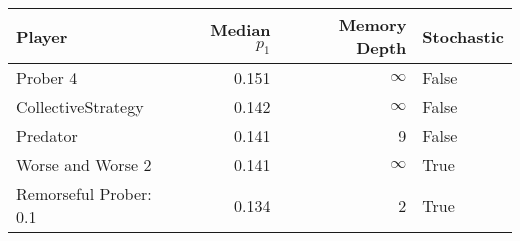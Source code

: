 \begin{tabular}{lrrl}
\toprule
                 Player &  Median $p_1$ &  Memory Depth & Stochastic \\
\midrule
               Prober 4 &         0.151 &            \(\infty\) &      False \\
     CollectiveStrategy &         0.142 &            \(\infty\) &      False \\
               Predator &         0.141 &             9 &      False \\
      Worse and Worse 2 &         0.141 &            \(\infty\) &       True \\
 Remorseful Prober: 0.1 &         0.134 &             2 &       True \\
\bottomrule
\end{tabular}
